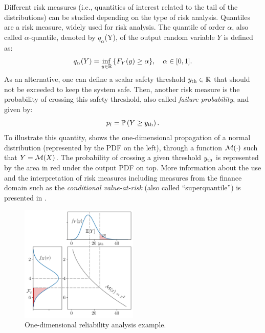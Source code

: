 Different risk measures (i.e., quantities of interest related to the tail of the distributions) can be studied depending on the type of risk analysis. 
Quantiles are a risk measure, widely used for risk analysis. 
The quantile of order $\alpha$, also called $\alpha$-quantile, denoted by $q_\alpha$(Y), of the output random variable $Y$ is defined as:
\begin{equation}
    q_\alpha(Y) = \inf_{y\in\mathbb{R}}{\left\{F_Y(y) \geq \alpha\right\}}, \quad \alpha \in [0, 1].    
\end{equation}
As an alternative, one can define a scalar safety threshold $y_\mathrm{th} \in \mathbb{R}$ that should not be exceeded to keep the system safe. 
Then, another risk measure is the probability of crossing this safety threshold, also called \textit{failure probability}, and given by: 
\begin{equation}
    p_\mathrm{f} = \mathbb{P}\left(Y \geq y_\mathrm{th}\right).
    \label{eq:failure_proba}
\end{equation}
To illustrate this quantity,  shows the one-dimensional propagation of a normal distribution (represented by the PDF on the left), through a function $\mathcal{M}(\cdot)$ such that $Y=\mathcal{M}(X)$.
The probability of crossing a given threshold $y_\mathrm{th}$ is represented by the area in red under the output PDF on top.
More information about the use and the interpretation of risk measures including measures from the finance domain such as the \textit{conditional value-at-risk} (also called ``superquantile'') is presented in \citet{rockafellar_2015}. 

\begin{figure}
    \centering
    \includegraphics[width=0.5\textwidth]{../numerical_experiments/chapter1/figures/1D_reliability.png}
    \caption{One-dimensional reliability analysis example.}
    \label{fig:1D_reliability}
\end{figure}


